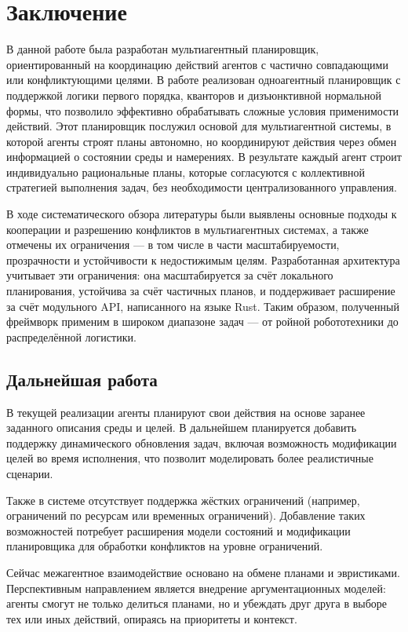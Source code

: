 \chapter*{Заключение}

В данной работе была разработан мультиагентный планировщик,
ориентированный на координацию действий агентов с частично совпадающими
или конфликтующими целями. В работе реализован одноагентный планировщик
с поддержкой логики первого порядка, кванторов и дизъюнктивной нормальной формы,
что позволило эффективно обрабатывать сложные условия применимости действий.
Этот планировщик послужил основой для мультиагентной системы,
в которой агенты строят планы автономно,
но координируют действия через обмен информацией о состоянии среды и намерениях.
В результате каждый агент строит индивидуально рациональные планы,
которые согласуются с коллективной стратегией выполнения задач,
без необходимости централизованного управления.

В ходе систематического обзора литературы были выявлены основные подходы
к кооперации и разрешению конфликтов в мультиагентных системах,
а также отмечены их ограничения —
в том числе в части масштабируемости, прозрачности
и устойчивости к недостижимым целям.
Разработанная архитектура учитывает эти ограничения:
она масштабируется за счёт локального планирования,
устойчива за счёт частичных планов,
и поддерживает расширение за счёт модульного API,
написанного на языке Rust.
Таким образом, полученный фреймворк применим
в широком диапазоне задач --- от ройной робототехники до распределённой логистики.

\section*{Дальнейшая работа}

В текущей реализации агенты планируют свои действия
на основе заранее заданного описания среды и целей.
В дальнейшем планируется добавить поддержку динамического обновления задач,
включая возможность модификации целей во время исполнения,
что позволит моделировать более реалистичные сценарии.

Также в системе отсутствует поддержка жёстких ограничений
(например, ограничений по ресурсам или временных ограничений).
Добавление таких возможностей потребует расширения модели состояний
и модификации планировщика для обработки конфликтов на уровне ограничений.

Сейчас межагентное взаимодействие основано на обмене планами и эвристиками.
Перспективным направлением является внедрение аргументационных моделей:
агенты смогут не только делиться планами, но и убеждать друг друга
в выборе тех или иных действий,
опираясь на приоритеты и контекст.

